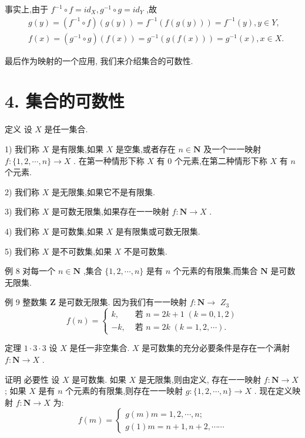 事实上,由于 ${f}^{-1} \circ  f = i{d}_{X},{g}^{-1} \circ  g = i{d}_{Y}$ ,故
\begin{align*}
	&g\left( y\right)  = \left( {{f}^{-1} \circ  f}\right) \left( {g\left( y\right) }\right)  = {f}^{-1}\left( {f\left( {g\left( y\right) }\right) }\right)  = {f}^{-1}\left( y\right) ,y \in  Y,\\
	&f\left( x\right)  = \left( {{g}^{-1} \circ  g}\right) \left( {f\left( x\right) }\right)  = {g}^{-1}\left( {g\left( {f\left( x\right) }\right) }\right)  = {g}^{-1}\left( x\right) ,x \in  X.
\end{align*}

最后作为映射的一个应用, 我们来介绍集合的可数性.

\section*{4. 集合的可数性}

定义 设 $X$ 是任一集合.

1) 我们称 $X$ 是有限集,如果 $X$ 是空集,或者存在 $n \in  \mathbf{N}$ 及一个一一映射 $f : \{ 1,2,\cdots ,n\}  \rightarrow  X$ . 在第一种情形下称 $X$ 有 0 个元素,在第二种情形下称 $X$ 有 $n$ 个元素.

2) 我们称 $X$ 是无限集,如果它不是有限集.

3) 我们称 $X$ 是可数无限集,如果存在一一映射 $f : \mathbf{N} \rightarrow  X$ .

4) 我们称 $X$ 是可数集,如果 $X$ 是有限集或可数无限集.

5) 我们称 $X$ 是不可数集,如果 $X$ 不是可数集.

例 8 对每一个 $n \in  \mathbf{N}$ ,集合 $\{ 1,2,\cdots ,n\}$ 是有 $n$ 个元素的有限集,而集合 $\mathbf{N}$ 是可数无限集.

例 9 整数集 $\mathbf{Z}$ 是可数无限集. 因为我们有一一映射 $f : \mathbf{N} \rightarrow$  ${Z}_{3}$
$$f\left( n\right)  = \left\{  \begin{array}{ll} k, & \text{ 若 }n = {2k} + 1\;\left( {k = 0,1,2}\right) \\   - k, & \text{ 若 }n = {2k}\;\left( {k = 1,2,\cdots }\right) . \end{array}\right.$$

定理 $1 \cdot  3 \cdot  3$ 设 $X$ 是任一非空集合. $X$ 是可数集的充分必要条件是存在一个满射 $f : \mathbf{N} \rightarrow  X$ .

证明 必要性 设 $X$ 是可数集. 如果 $X$ 是无限集,则由定义, 存在一一映射 $f : \mathbf{N} \rightarrow  X$ ; 如果 $X$ 是有 $n$ 个元素的有限集,则存在一一映射 $g : \{ 1,2,\cdots ,n\}  \rightarrow  X$ . 现在定义映射 $f : \mathbf{N} \rightarrow  X$ 为:
$$f\left( m\right)  = \left\{  \begin{array}{l} g\left( m\right) m = 1,2,\cdots ,n; \\  g\left( 1\right) m = n + 1,n + 2,\cdots \cdots  \end{array}\right.$$

